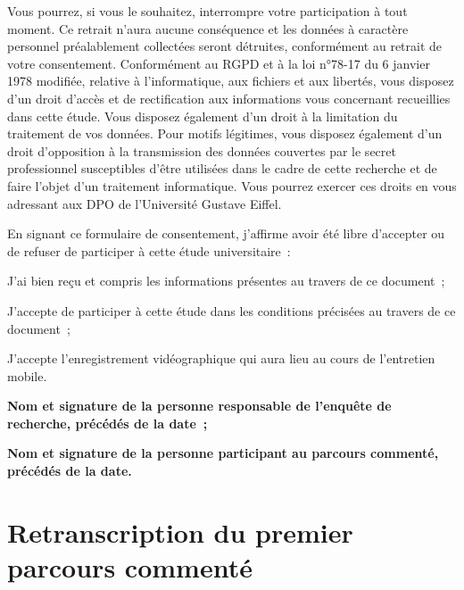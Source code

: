 Vous pourrez, si vous le souhaitez, interrompre votre participation à tout moment. Ce retrait n’aura aucune conséquence et les données à caractère personnel préalablement collectées seront détruites, conformément au retrait de votre consentement. Conformément au \acrfull{RGPD} et à la loi n°78-17 du 6 janvier 1978 modifiée, relative à l’informatique, aux fichiers et aux libertés, vous disposez d’un droit d’accès et de rectification aux informations vous concernant recueillies dans cette étude. Vous disposez également d’un droit à la limitation du traitement de vos données. Pour motifs légitimes, vous disposez également d’un droit d’opposition à la transmission des données couvertes par le secret professionnel susceptibles d’être utilisées dans le cadre de cette recherche et de faire l’objet d’un traitement informatique. Vous pourrez exercer ces droits en vous adressant aux \acrfull{DPO} de l’Université Gustave Eiffel.%
    
En signant ce formulaire de consentement, j’affirme avoir été libre d’accepter ou de refuser de participer à cette étude universitaire~:
\begin{customitemize}
    \item J’ai bien reçu et compris les informations présentes au travers de ce document~;
    \item J’accepte de participer à cette étude dans les conditions précisées au travers de ce document~;
    \item J’accepte l’enregistrement vidéographique qui aura lieu au cours de l’entretien mobile.
\end{customitemize}%

\begin{customitemize}
    \item \textbf{Nom et signature de la personne responsable de l’enquête de recherche, précédés de la date~;}
    \item \textbf{Nom et signature de la personne participant au parcours commenté, précédés de la date.}
\end{customitemize}%

    \newpage
\section{Retranscription du premier parcours commenté}
    \label{annexes:retranscription-pcte1}


